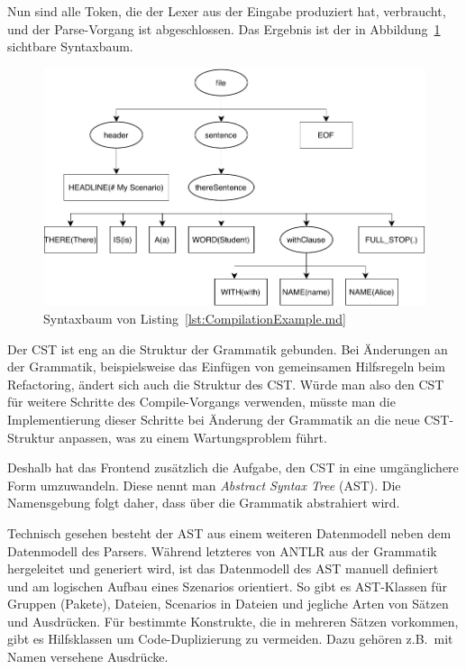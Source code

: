Nun sind alle Token, die der Lexer aus der Eingabe produziert hat, verbraucht, und der Parse-Vorgang ist abgeschlossen.
Das Ergebnis ist der in Abbildung~\ref{fig:parsetree} sichtbare Syntaxbaum.

\begin{figure}
    \includegraphics[width=\textwidth]{chapter/fulib-scenarios/img/parsetree.pdf}
    \caption{Syntaxbaum von Listing~\ref{lst:CompilationExample.md}}
    \label{fig:parsetree}
\end{figure}


Der CST ist eng an die Struktur der Grammatik gebunden.
Bei Änderungen an der Grammatik, beispielsweise das Einfügen von gemeinsamen Hilfsregeln beim Refactoring,
ändert sich auch die Struktur des CST\@.
Würde man also den CST für weitere Schritte des Compile-Vorgangs verwenden,
müsste man die Implementierung dieser Schritte bei Änderung der Grammatik an die neue CST-Struktur anpassen,
was zu einem Wartungsproblem führt.

Deshalb hat das Frontend zusätzlich die Aufgabe, den CST in eine umgänglichere Form umzuwandeln.
Diese nennt man \emph{Abstract Syntax Tree} (AST).
Die Namensgebung folgt daher, dass über die Grammatik abstrahiert wird.

Technisch gesehen besteht der AST aus einem weiteren Datenmodell neben dem Datenmodell des Parsers.
Während letzteres von ANTLR aus der Grammatik hergeleitet und generiert wird,
ist das Datenmodell des AST manuell definiert und am logischen Aufbau eines Szenarios orientiert.
So gibt es AST-Klassen für Gruppen (Pakete), Dateien, Scenarios in Dateien und jegliche Arten von Sätzen und Ausdrücken.
Für bestimmte Konstrukte, die in mehreren Sätzen vorkommen, gibt es Hilfsklassen um Code-Duplizierung zu vermeiden.
Dazu gehören z.B.\ mit Namen versehene Ausdrücke.

